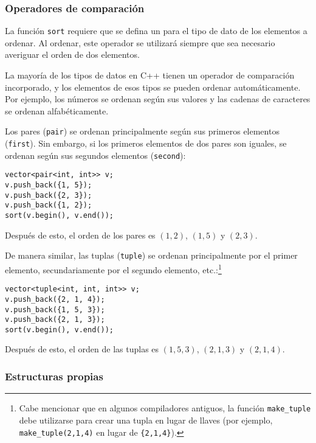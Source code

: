 \subsubsection{Operadores de comparación}


La función \texttt{sort} requiere que
se defina un  para el tipo de dato
de los elementos a ordenar.
Al ordenar, este operador se utilizará
siempre que sea necesario averiguar el orden de dos elementos.

La mayoría de los tipos de datos en C++ tienen un operador de comparación incorporado,
y los elementos de esos tipos se pueden ordenar automáticamente.
Por ejemplo, los números se ordenan según sus valores
y las cadenas de caracteres se ordenan alfabéticamente.


Los pares (\texttt{pair}) se ordenan principalmente según sus
primeros elementos (\texttt{first}).
Sin embargo, si los primeros elementos de dos pares son iguales,
se ordenan según sus segundos elementos (\texttt{second}):
\begin{lstlisting}
vector<pair<int, int>> v;
v.push_back({1, 5});
v.push_back({2, 3});
v.push_back({1, 2});
sort(v.begin(), v.end());
\end{lstlisting}
Después de esto, el orden de los pares es
$(1,2)$, $(1,5)$ y $(2,3)$.


De manera similar, las tuplas (\texttt{tuple})
se ordenan principalmente por el primer elemento,
secundariamente por el segundo elemento, etc.:\footnote{Cabe mencionar que en algunos compiladores antiguos,
    la función \texttt{make\_tuple} debe utilizarse para crear una tupla en lugar de
    llaves (por ejemplo, \texttt{make\_tuple(2,1,4)} en lugar de \texttt{\{2,1,4\}}).}
\begin{lstlisting}
vector<tuple<int, int, int>> v;
v.push_back({2, 1, 4});
v.push_back({1, 5, 3});
v.push_back({2, 1, 3});
sort(v.begin(), v.end());
\end{lstlisting}
Después de esto, el orden de las tuplas es
$(1, 5, 3)$, $(2, 1, 3)$ y $(2, 1, 4)$.

\subsubsection{Estructuras propias}


